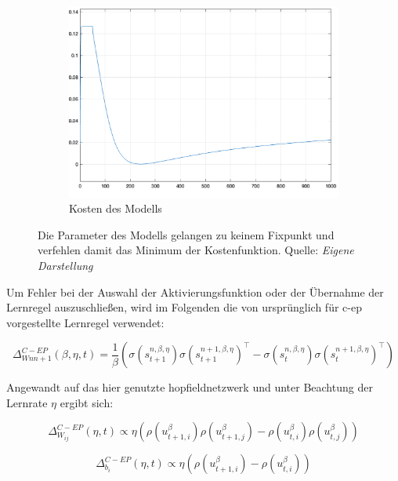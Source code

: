 \begin{figure}[h]
\begin{subfigure}[b]{0.3\textwidth}
    \includegraphics[width=\textwidth]{abbildungen/c_ep_convergence_kosten.png}
    \caption{Kosten des Modells}
  \end{subfigure}
  \caption{Die Parameter des Modells gelangen zu keinem Fixpunkt und verfehlen damit das Minimum der Kostenfunktion. Quelle: \textit{Eigene Darstellung}}
  \label{fig:C-EP Konvergenz Problem}
\end{figure}

Um Fehler bei der Auswahl der Aktivierungsfunktion oder der Übernahme der Lernregel auszuschließen, wird im Folgenden die von \citeauthor{Ernoult2020} ursprünglich für \gls{c-ep} vorgestellte Lernregel verwendet:

\[\Delta^{C-EP}_{Wnn+1}(\beta,\eta,t)=\frac{1}{\beta}\left(\sigma\left(s^{n,\beta,\eta}_{t+1}\right)\sigma\left(s^{n+1,\beta,\eta}_{t+1}\right)^\intercal-\sigma\left(s^{n,\beta,\eta}_{t}\right)\sigma\left(s^{n+1,\beta,\eta}_{t}\right)^\intercal\right)\]

Angewandt auf das hier genutzte \gls{hopfieldnetzwerk} und unter Beachtung der Lernrate \(\eta\) ergibt sich:

\[\Delta^{C-EP}_{W_{ij}}(\eta,t)\propto\eta\left(\rho(u^{\beta}_{t+1,i})\rho(u^{\beta}_{t+1,j})-\rho(u^{\beta}_{t,i})\rho(u^{\beta}_{t,j})\right)\]

\[\Delta^{C-EP}_{b_{i}}(\eta,t)\propto\eta\left(\rho(u^{\beta}_{t+1,i})-\rho(u^{\beta}_{t,i})\right)\]

